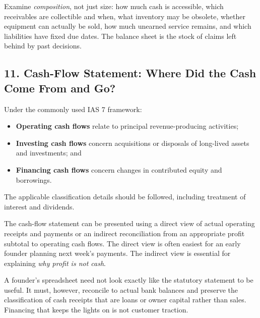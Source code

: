 Examine \emph{composition}, not just size: how much cash is accessible, which receivables are collectible and when, what inventory may be obsolete, whether equipment can actually be sold, how much unearned service remains, and which liabilities have fixed due dates. The balance sheet is the stock of claims left behind by past decisions.

\subsection*{11. Cash-Flow Statement: Where Did the Cash Come From and Go?}

Under the commonly used IAS 7 framework:
\begin{itemize}
\item \textbf{Operating cash flows} relate to principal revenue-producing activities;
\item \textbf{Investing cash flows} concern acquisitions or disposals of long-lived assets and investments; and
\item \textbf{Financing cash flows} concern changes in contributed equity and borrowings.
\end{itemize}
The applicable classification details should be followed, including treatment of interest and dividends.

The cash-flow statement can be presented using a direct view of actual operating receipts and payments or an indirect reconciliation from an appropriate profit subtotal to operating cash flows. The direct view is often easiest for an early founder planning next week's payments. The indirect view is essential for explaining \emph{why profit is not cash}.

A founder's spreadsheet need not look exactly like the statutory statement to be useful. It must, however, reconcile to actual bank balances and preserve the classification of cash receipts that are loans or owner capital rather than sales. Financing that keeps the lights on is not customer traction.
